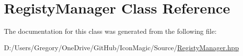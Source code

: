 \hypertarget{class_registy_manager}{}\section{Registy\+Manager Class Reference}
\label{class_registy_manager}


The documentation for this class was generated from the following file\+:\begin{DoxyCompactItemize}
\item 
D\+:/\+Users/\+Gregory/\+One\+Drive/\+Git\+Hub/\+Icon\+Magic/\+Source/\hyperlink{_registy_manager_8hpp}{Registy\+Manager.\+hpp}\end{DoxyCompactItemize}
